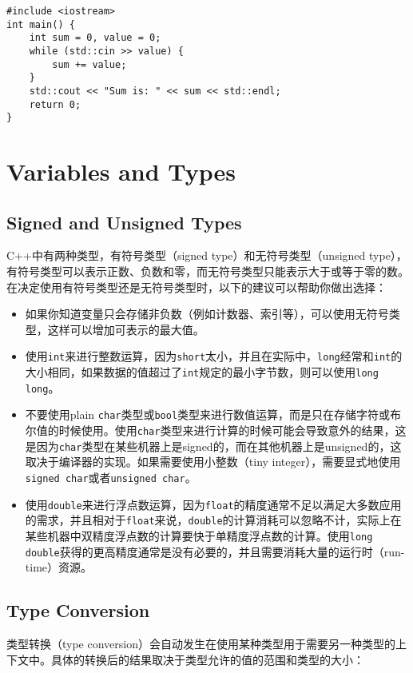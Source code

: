 \begin{verbatim}
#include <iostream>
int main() {
    int sum = 0, value = 0;
    while (std::cin >> value) {
        sum += value;
    }
    std::cout << "Sum is: " << sum << std::endl;
    return 0;
}
\end{verbatim}

\chapter{Variables and Types}
\section{Signed and Unsigned Types}
C++中有两种类型，有符号类型（signed type）和无符号类型（unsigned type），有符号类型可以表示正数、负数和零，而无符号类型只能表示大于或等于零的数。在决定使用有符号类型还是无符号类型时，以下的建议可以帮助你做出选择：

\begin{itemize}
    \item 如果你知道变量只会存储非负数（例如计数器、索引等），可以使用无符号类型，这样可以增加可表示的最大值。
    \item 使用\texttt{int}来进行整数运算，因为\texttt{short}太小，并且在实际中，\texttt{long}经常和\texttt{int}的大小相同，如果数据的值超过了\texttt{int}规定的最小字节数，则可以使用\texttt{long long}。
    \item 不要使用plain \texttt{char}类型或\texttt{bool}类型来进行数值运算，而是只在存储字符或布尔值的时候使用。使用\texttt{char}类型来进行计算的时候可能会导致意外的结果，这是因为\texttt{char}类型在某些机器上是signed的，而在其他机器上是unsigned的，这取决于编译器的实现。如果需要使用小整数（tiny integer），需要显式地使用\texttt{signed char}或者\texttt{unsigned char}。
    \item 使用\texttt{double}来进行浮点数运算，因为\texttt{float}的精度通常不足以满足大多数应用的需求，并且相对于\texttt{float}来说，\texttt{double}的计算消耗可以忽略不计，实际上在某些机器中双精度浮点数的计算要快于单精度浮点数的计算。使用\texttt{long double}获得的更高精度通常是没有必要的，并且需要消耗大量的运行时（run-time）资源。
\end{itemize}

\section{Type Conversion}
类型转换（type conversion）会自动发生在使用某种类型用于需要另一种类型的上下文中。具体的转换后的结果取决于类型允许的值的范围和类型的大小：

